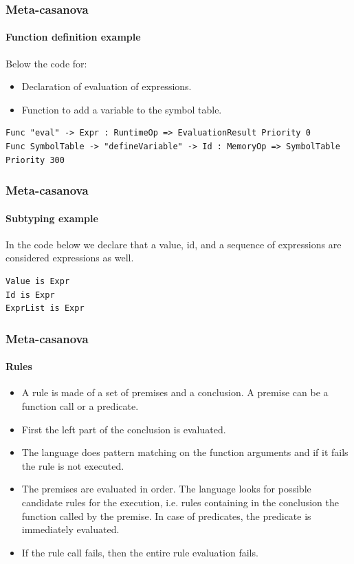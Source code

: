 \documentclass[mathserif,serif]{beamer}
\begin{document}
\begin{frame}[fragile]
	\frametitle{Meta-casanova}
	\framesubtitle{Function definition example}
	Below the code for:
	\begin{itemize}
		\item Declaration of evaluation of expressions.
		\item Function to add a variable to the symbol table.
	\end{itemize}
	
	\begin{lstlisting}
Func "eval" -> Expr : RuntimeOp => EvaluationResult Priority 0
Func SymbolTable -> "defineVariable" -> Id : MemoryOp => SymbolTable Priority 300
	\end{lstlisting}
\end{frame}

\begin{frame}[fragile]
	\frametitle{Meta-casanova}
	\framesubtitle{Subtyping example}
	
	In the code below we declare that a value, id, and a sequence of expressions are considered expressions as well.
		\begin{lstlisting}
Value is Expr
Id is Expr
ExprList is Expr
		\end{lstlisting}
\end{frame}

\begin{frame}
	\frametitle{Meta-casanova}
	\framesubtitle{Rules}
	
	\begin{itemize}
		\item A rule is made of a set of premises and a conclusion. A premise can be a function call or a predicate.
		\item First the left part of the conclusion is evaluated. 
		\item The language does pattern matching on the function arguments and if it fails the rule is not executed.
		\item The premises are evaluated in order. The language looks for possible candidate rules for the execution, i.e. rules containing in the conclusion the function called by the premise. In case of predicates, the predicate is immediately evaluated.
		\item If the rule call fails, then the entire rule evaluation fails.
	\end{itemize}
\end{frame}
\end{document}
